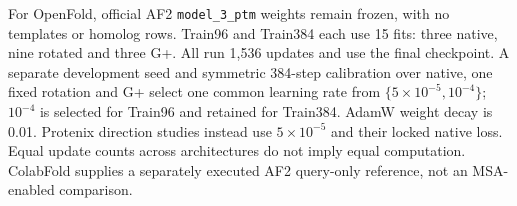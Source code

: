 For OpenFold, official AF2 \nolinkurl{model_3_ptm} weights remain frozen, with no templates
or homolog rows. Train96 and Train384 each use 15 fits: three native, nine
rotated and three G+. All run 1,536 updates and use the final checkpoint. A
separate development seed and symmetric 384-step calibration over native,
one fixed rotation and G+ select one common learning rate from
\(\{5\times10^{-5},10^{-4}\}\); \(10^{-4}\) is selected for Train96 and retained
for Train384. AdamW weight decay is 0.01. Protenix direction studies instead
use \(5\times10^{-5}\) and their locked native loss. Equal update counts across
architectures do not imply equal computation. ColabFold supplies a separately
executed AF2 query-only reference, not an MSA-enabled comparison.
